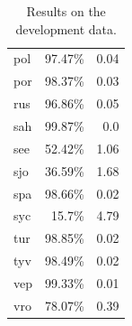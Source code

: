 \documentclass[11pt,a4paper]{article}
\newcommand\jp[1]{\textbf{JP: #1}}
\begin{document}
\begin{table}[ht!]
\begin{tabular}{lrr}
  pol & 97.47\% & 0.04 \\
  por & 98.37\% & 0.03 \\
  rus & 96.86\% & 0.05 \\
  sah & 99.87\% & 0.0 \\
  see & 52.42\% & 1.06 \\
  sjo & 36.59\% & 1.68 \\
  spa & 98.66\% & 0.02 \\
  syc & 15.7\% & 4.79 \\
  tur & 98.85\% & 0.02 \\
  tyv & 98.49\% & 0.02 \\
  vep & 99.33\% & 0.01 \\
  vro & 78.07\% & 0.39 \\
\end{tabular} 
\caption{Results on the development data.}
\label{tab:accuracy-dev}
\end{table}







\end{document}
